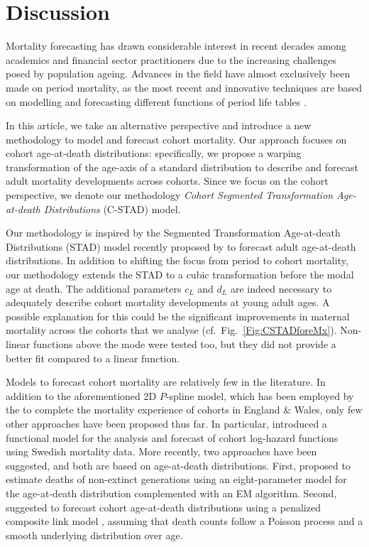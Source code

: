 \documentclass[11pt, a4paper]{article}
\begin{document}
\section{Discussion} 
\label{Sec:Discussion}
Mortality forecasting has drawn considerable interest in recent decades among academics and financial sector practitioners due to the increasing challenges posed by population ageing. Advances in the field have almost exclusively been made on period mortality, as the most recent and innovative techniques are based on modelling and forecasting different functions of period life tables \cite[see, for example,][]{lee1992modeling,cairns2006two,raftery2013bayesian}.  
 
In this article, we take an alternative perspective and introduce a new methodology to model and forecast cohort mortality. Our approach focuses on cohort age-at-death distributions: specifically, we propose a warping transformation of the age-axis of a standard distribution to describe and forecast adult mortality developments across cohorts. Since we focus on the cohort perspective, we denote our methodology \emph{Cohort Segmented Transformation Age-at-death Distributions} (C-STAD) model. 

Our methodology is inspired by the Segmented Transformation Age-at-death Distributions (STAD) model recently proposed by \cite{basellini2019modeling} to forecast adult age-at-death distributions. In addition to shifting the focus from period to cohort mortality, our methodology extends the STAD to a cubic transformation before the modal age at death. The additional parameters $c_L$ and $d_L$ are indeed necessary to adequately describe cohort mortality developments at young adult ages. A possible explanation for this could be the significant improvements in maternal mortality across the cohorts that we analyse (cf.~Fig.~\ref{Fig:CSTADforeMx}). Non-linear functions above the mode were tested too, but they did not provide a better fit compared to a linear function. 

Models to forecast cohort mortality are relatively few in the literature. In addition to the aforementioned 2D $P$-spline model, which has been employed by the \cite{cmi2007stochastic} to complete the mortality experience of cohorts in England \& Wales, only few other approaches have been proposed thus far. In particular, \cite{chiou2009modeling} introduced a functional model for the analysis and forecast of cohort log-hazard functions using Swedish mortality data. More recently, two approaches have been suggested, and both are based on age-at-death distributions. First, \cite{zanotto2017reconstruction} proposed to estimate deaths of non-extinct generations using an eight-parameter model for the age-at-death distribution complemented with an EM algorithm. Second, \cite{rizzi2019forecasting} suggested to forecast cohort age-at-death distributions using a penalized composite link model \citep{eilers2007ill}, assuming that death counts follow a Poisson process and a smooth underlying distribution over age. 
\end{document}
